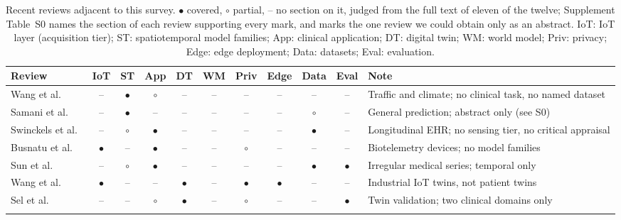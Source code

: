 \documentclass[journal]{IEEEtran}
\newif\ifsubmission
\begin{document}
\begin{table}[t]
\centering
\caption{Recent reviews adjacent to this survey. $\bullet$ covered, $\circ$ partial, -- no section on it, judged from the full text of eleven of the twelve; Supplement Table~S0 names the section of each review supporting every mark, and marks the one review we could obtain only as an abstract. IoT: IoT layer (acquisition tier); ST: spatiotemporal model families; App: clinical application; DT: digital twin; WM: world model; Priv: privacy; Edge: edge deployment; Data: datasets; Eval: evaluation.}
\label{tab:related-surveys}
\ifsubmission
\scriptsize
\setlength{\tabcolsep}{4pt}
\renewcommand{\arraystretch}{1.08}
\begin{tabularx}{\textwidth}{>{\raggedright\arraybackslash}p{2.7cm} c c c c c c c c c >{\raggedright\arraybackslash}X}
\toprule
\textbf{Review} & \textbf{IoT} & \textbf{ST} & \textbf{App} & \textbf{DT} & \textbf{WM} & \textbf{Priv} & \textbf{Edge} & \textbf{Data} & \textbf{Eval} & \textbf{Note} \\
\midrule
Wang et al.~\cite{wang2022deep} & -- & $\bullet$ & $\circ$ & -- & -- & -- & -- & -- & -- & Traffic and climate; no clinical task, no named dataset \\
\addlinespace[1pt]
\rowcolor{tablestripe}Samani et al.~\cite{samani2026stdl} & -- & $\bullet$ & -- & -- & -- & -- & -- & $\circ$ & -- & General prediction; abstract only (see S0) \\
\addlinespace[1pt]
Swinckels et al.~\cite{swinckels2024ehr} & -- & $\circ$ & $\bullet$ & -- & -- & -- & -- & $\bullet$ & -- & Longitudinal EHR; no sensing tier, no critical appraisal \\
\addlinespace[1pt]
\rowcolor{tablestripe}Busnatu et al.~\cite{Busnatu2022} & $\bullet$ & -- & $\bullet$ & -- & -- & $\circ$ & -- & -- & -- & Biotelemetry devices; no model families \\
\addlinespace[1pt]
Sun et al.~\cite{sun2026irregularmedical} & -- & $\circ$ & $\bullet$ & -- & -- & -- & -- & $\bullet$ & $\bullet$ & Irregular medical series; temporal only \\
\addlinespace[1pt]
\rowcolor{tablestripe}Wang et al.~\cite{Wang2023Survey} & $\bullet$ & -- & -- & $\bullet$ & -- & $\bullet$ & $\bullet$ & -- & -- & Industrial IoT twins, not patient twins \\
\addlinespace[1pt]
Sel et al.~\cite{Sel2025VVUQ} & -- & -- & $\circ$ & $\bullet$ & -- & $\circ$ & -- & -- & $\bullet$ & Twin validation; two clinical domains only \\
\addlinespace[1pt]

\end{tabularx}
\end{table}
\end{document}

